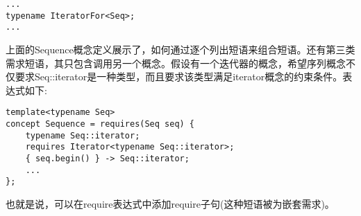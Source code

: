 \begin{lstlisting}[style=styleCXX]
...
typename IteratorFor<Seq>;
...
\end{lstlisting}

上面的Sequence概念定义展示了，如何通过逐个列出短语来组合短语。还有第三类需求短语，其只包含调用另一个概念。假设有一个迭代器的概念，希望序列概念不仅要求Seq::iterator是一种类型，而且要求该类型满足iterator概念的约束条件。表达式如下:

\begin{lstlisting}[style=styleCXX]
template<typename Seq>
concept Sequence = requires(Seq seq) {
	typename Seq::iterator;
	requires Iterator<typename Seq::iterator>;
	{ seq.begin() } -> Seq::iterator;
	...
};
\end{lstlisting}

也就是说，可以在require表达式中添加require子句(这种短语被为嵌套需求)。
















